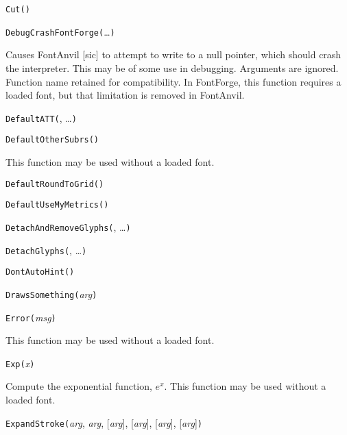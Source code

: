 
\noindent\texttt{Cut(}\texttt{)}


\noindent\texttt{DebugCrashFontForge(}\ldots\texttt{)}

Causes FontAnvil [sic] to attempt to write to a null pointer, which should
crash the interpreter.  This may be of some use in debugging.  Arguments are
ignored.  Function name retained for compatibility.  In FontForge, this
function requires a loaded font, but that limitation is removed in FontAnvil.


\noindent\texttt{DefaultATT(}, \ldots\texttt{)}


\noindent\texttt{DefaultOtherSubrs(}\texttt{)}

This function may be used without a loaded font.


\noindent\texttt{DefaultRoundToGrid(}\texttt{)}


\noindent\texttt{DefaultUseMyMetrics(}\texttt{)}


\noindent\texttt{DetachAndRemoveGlyphs(}, \ldots\texttt{)}


\noindent\texttt{DetachGlyphs(}, \ldots\texttt{)}


\noindent\texttt{DontAutoHint(}\texttt{)}


\noindent\texttt{DrawsSomething(}\textit{arg}\texttt{)}


\noindent\texttt{Error(}\textit{msg}\texttt{)}

This function may be used without a loaded font.


\noindent\texttt{Exp(}\textit{x}\texttt{)}

Compute the exponential function, $e^x$.
This function may be used without a loaded font.


\noindent\texttt{ExpandStroke(}\textit{arg}, \textit{arg}, [\textit{arg}], [\textit{arg}], [\textit{arg}], [\textit{arg}]\texttt{)}

